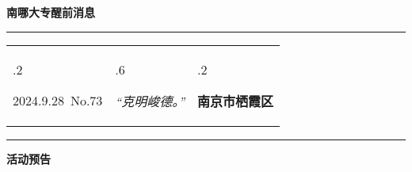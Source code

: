 \documentclass[letterpaper, 12pt]{article}
\begin{document}
\begin{center}
    \Huge\textbf{南哪大专醒前消息}
\end{center}
\vspace{4mm}
\hrule
\renewcommand\tabularxcolumn[1]{m{#1}}
\begin{tabularx}{\textwidth}{>{\hsize.2\hsize}X>{\hsize.6\hsize}X>{\hsize.2\hsize}X}
    \begin{flushleft}
        2024.9.28\, No.73
    \end{flushleft}
    &
    \begin{center}
        \textit{“克明峻德。”}
    \end{center}
    &
    \begin{flushright}
        \textbf{南京市栖霞区}
    \end{flushright}
\end{tabularx}
\vspace{-3.5mm}
\hrule
\vspace{4mm}
\centerline{\huge\textbf{活动预告}}
\end{document}
